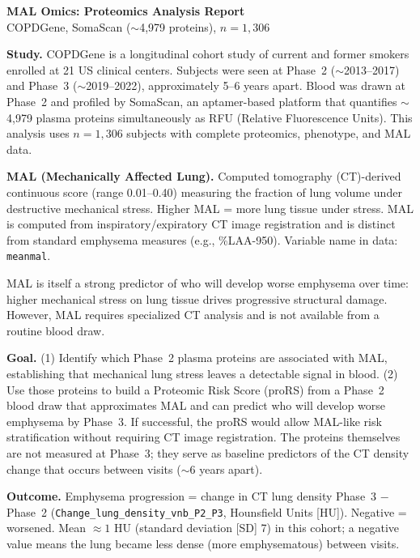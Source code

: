 \documentclass[11pt, letterpaper]{article}
\begin{document}
\begin{center}
  {\Large \textbf{MAL Omics: Proteomics Analysis Report}} \\[4pt]
  {\normalsize COPDGene, SomaScan ($\sim$4,979 proteins), $n = 1{,}306$}
\end{center}

\vspace{6pt}
\noindent\textbf{Study.}
COPDGene is a longitudinal cohort study of current and former smokers
enrolled at 21 US clinical centers. Subjects were seen at Phase~2
($\sim$2013--2017) and Phase~3 ($\sim$2019--2022), approximately
5--6 years apart. Blood was drawn at Phase~2 and
profiled by SomaScan, an aptamer-based platform that quantifies
$\sim$4,979 plasma proteins simultaneously as RFU (Relative Fluorescence
Units). This analysis uses $n = 1{,}306$ subjects with complete
proteomics, phenotype, and MAL data.

\noindent\textbf{MAL (Mechanically Affected Lung).}
Computed tomography (CT)-derived continuous score (range 0.01--0.40)
measuring the fraction of lung volume under destructive mechanical
stress. Higher MAL = more lung tissue under stress. MAL is computed from
inspiratory/expiratory CT image registration and is distinct from
standard emphysema measures (e.g., \%LAA-950). Variable name in data:
\texttt{meanmal}.

MAL is itself a strong predictor of who will develop worse emphysema
over time: higher mechanical stress on lung tissue drives progressive
structural damage. However, MAL requires specialized CT analysis and is
not available from a routine blood draw.

\noindent\textbf{Goal.}
(1) Identify which Phase~2 plasma proteins are associated with MAL,
establishing that mechanical lung stress leaves a detectable signal
in blood.
(2) Use those proteins to build a Proteomic Risk Score (proRS) from a
Phase~2 blood draw that approximates MAL and can predict who will
develop worse emphysema by Phase~3. If successful, the proRS would
allow MAL-like risk stratification without requiring CT image
registration. The proteins themselves are not measured at Phase~3;
they serve as baseline predictors of the CT density change that
occurs between visits ($\sim$6 years apart).

\noindent\textbf{Outcome.}
Emphysema progression = change in CT lung density Phase~3 $-$ Phase~2
(\texttt{Change\_lung\_\allowbreak density\_\allowbreak vnb\_\allowbreak P2\_\allowbreak P3},
Hounsfield Units [HU]). Negative = worsened. Mean $\approx 1$ HU
(standard deviation [SD] 7) in this cohort; a negative value means the
lung became less dense (more emphysematous) between visits.
\end{document}
